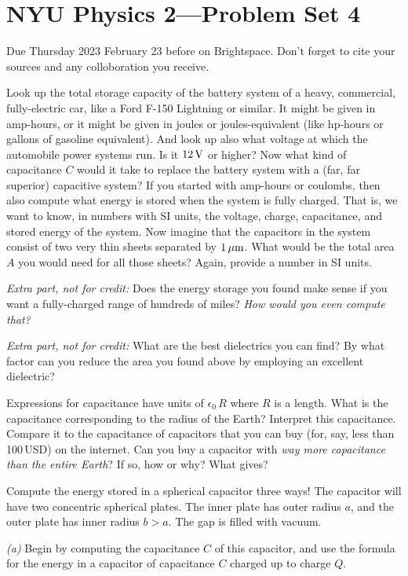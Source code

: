 \documentclass[12pt]{article}
\begin{document}
\section*{NYU Physics 2---Problem Set 4}

Due Thursday 2023 February 23 before on Brightspace.
Don't forget to cite your sources and any colloboration you receive.

\startproblem
Look up the total storage capacity of the battery system of a heavy,
commercial, fully-electric car, like a Ford F-150 Lightning or similar. It might
be given in amp-hours, or it might be given in joules or
joules-equivalent (like hp-hours or gallons of gasoline
equivalent). And look up also what voltage at which the automobile
power systems run. Is it $12\,\mathrm{V}$ or higher? Now what kind of
capacitance $C$ would it take to replace the battery system with a
(far, far superior) capacitive system? If you started with amp-hours
or coulombs, then also compute what energy is stored when the system
is fully charged. That is, we want to know, in numbers with SI units, the voltage,
charge, capacitance, and stored energy of the system. Now imagine that
the capacitors in the system consist of two very thin sheets separated
by $1\,\mathrm{\mu m}$.  What would be the total area $A$ you would need for all
those sheets? Again, provide a number in SI units.

\emph{Extra part, not for credit:} Does the energy storage you found
make sense if you want a fully-charged range of hundreds of miles? \emph{How
would you even compute that?}

\emph{Extra part, not for credit:} What are the best dielectrics you can find?
By what factor can you reduce the area you found above by employing an excellent
dielectric?

\startproblem
Expressions for capacitance have units of $\epsilon_0\,R$ where $R$ is a length.
What is the capacitance corresponding to the radius of the Earth?
Interpret this capacitance.
Compare it to the capacitance of capacitors that you can buy (for,
say, less than 100\,USD) on the internet.
Can you buy a capacitor with \emph{way more capacitance than the entire
  Earth}?
If so, how or why? What gives?

\startproblem
Compute the energy stored in a spherical capacitor three ways!
The capacitor will have two concentric spherical plates.
The inner plate has outer radius $a$, and the outer plate has
inner radius $b>a$.
The gap is filled with vacuum.

\textsl{(a)}
Begin by computing the capacitance $C$ of this capacitor, and
use the formula for the energy in a capacitor of capacitance $C$
charged up to charge $Q$.
\end{document}
